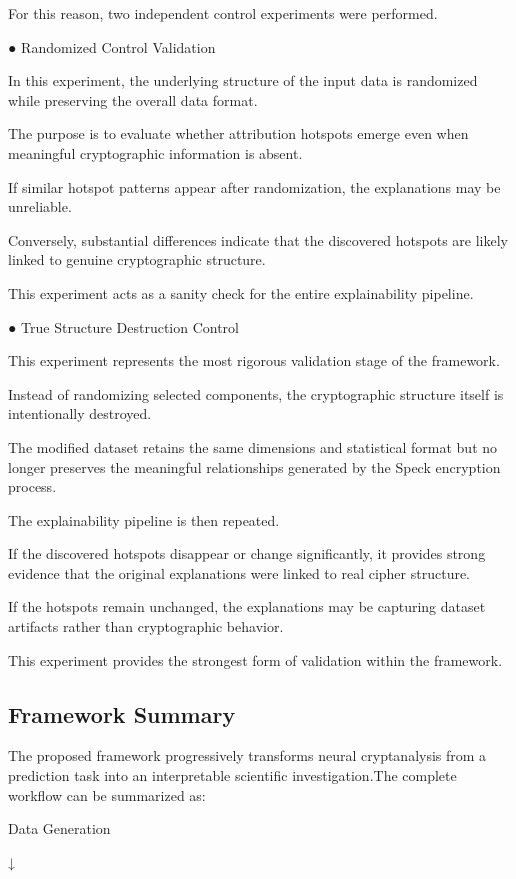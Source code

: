 For this reason, two independent control experiments were performed. 

●  Randomized Control Validation 

In this experiment, the underlying structure of the input data is randomized while preserving the 
overall data format. 

The purpose is to evaluate whether attribution hotspots emerge even when meaningful 
cryptographic information is absent. 

If similar hotspot patterns appear after randomization, the explanations may be unreliable. 


Conversely, substantial differences indicate that the discovered hotspots are likely linked to 
genuine cryptographic structure. 

This experiment acts as a sanity check for the entire explainability pipeline. 

●  True Structure Destruction Control 

This experiment represents the most rigorous validation stage of the framework. 

Instead of randomizing selected components, the cryptographic structure itself is intentionally 
destroyed. 

The modified dataset retains the same dimensions and statistical format but no longer preserves 
the meaningful relationships generated by the Speck encryption process. 

The explainability pipeline is then repeated. 

If the discovered hotspots disappear or change significantly, it provides strong evidence that the 
original explanations were linked to real cipher structure. 

If the hotspots remain unchanged, the explanations may be capturing dataset artifacts rather than 
cryptographic behavior. 

This experiment provides the strongest form of validation within the framework. 

\subsection{Framework Summary}

The proposed framework progressively transforms neural cryptanalysis from a prediction task 
into an interpretable scientific investigation.The complete workflow can be summarized as: 

Data Generation 

          ↓ 


